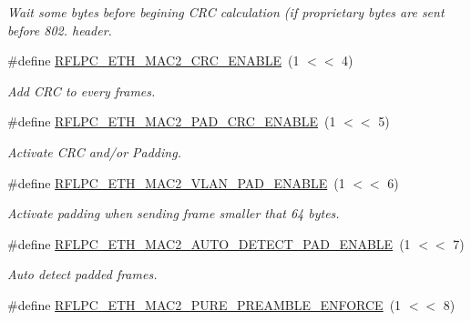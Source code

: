 \begin{DoxyCompactItemize}
\begin{DoxyCompactList}\small\item\em Wait some bytes before begining C\-R\-C calculation (if proprietary bytes are sent before 802. header. \end{DoxyCompactList}\item 
\hypertarget{group__eth_ga48e2ce03c6931c4604781e756e23ab44}{\#define \hyperlink{group__eth_ga48e2ce03c6931c4604781e756e23ab44}{R\-F\-L\-P\-C\-\_\-\-E\-T\-H\-\_\-\-M\-A\-C2\-\_\-\-C\-R\-C\-\_\-\-E\-N\-A\-B\-L\-E}~(1 $<$$<$ 4)}\label{group__eth_ga48e2ce03c6931c4604781e756e23ab44}

\begin{DoxyCompactList}\small\item\em Add C\-R\-C to every frames. \end{DoxyCompactList}\item 
\hypertarget{group__eth_ga3416ab0daad7feb2651e2609bbab702e}{\#define \hyperlink{group__eth_ga3416ab0daad7feb2651e2609bbab702e}{R\-F\-L\-P\-C\-\_\-\-E\-T\-H\-\_\-\-M\-A\-C2\-\_\-\-P\-A\-D\-\_\-\-C\-R\-C\-\_\-\-E\-N\-A\-B\-L\-E}~(1 $<$$<$ 5)}\label{group__eth_ga3416ab0daad7feb2651e2609bbab702e}

\begin{DoxyCompactList}\small\item\em Activate C\-R\-C and/or Padding. \end{DoxyCompactList}\item 
\hypertarget{group__eth_ga936446c542259464dbb308d5e286d282}{\#define \hyperlink{group__eth_ga936446c542259464dbb308d5e286d282}{R\-F\-L\-P\-C\-\_\-\-E\-T\-H\-\_\-\-M\-A\-C2\-\_\-\-V\-L\-A\-N\-\_\-\-P\-A\-D\-\_\-\-E\-N\-A\-B\-L\-E}~(1 $<$$<$ 6)}\label{group__eth_ga936446c542259464dbb308d5e286d282}

\begin{DoxyCompactList}\small\item\em Activate padding when sending frame smaller that 64 bytes. \end{DoxyCompactList}\item 
\hypertarget{group__eth_gac8b829eb0ac5dddb5625dc50470225d3}{\#define \hyperlink{group__eth_gac8b829eb0ac5dddb5625dc50470225d3}{R\-F\-L\-P\-C\-\_\-\-E\-T\-H\-\_\-\-M\-A\-C2\-\_\-\-A\-U\-T\-O\-\_\-\-D\-E\-T\-E\-C\-T\-\_\-\-P\-A\-D\-\_\-\-E\-N\-A\-B\-L\-E}~(1 $<$$<$ 7)}\label{group__eth_gac8b829eb0ac5dddb5625dc50470225d3}

\begin{DoxyCompactList}\small\item\em Auto detect padded frames. \end{DoxyCompactList}\item 
\hypertarget{group__eth_gabcfd8e7a321eb10dec18506cf9386792}{\#define \hyperlink{group__eth_gabcfd8e7a321eb10dec18506cf9386792}{R\-F\-L\-P\-C\-\_\-\-E\-T\-H\-\_\-\-M\-A\-C2\-\_\-\-P\-U\-R\-E\-\_\-\-P\-R\-E\-A\-M\-B\-L\-E\-\_\-\-E\-N\-F\-O\-R\-C\-E}~(1 $<$$<$ 8)}\label{group__eth_gabcfd8e7a321eb10dec18506cf9386792}


\end{DoxyCompactItemize}
